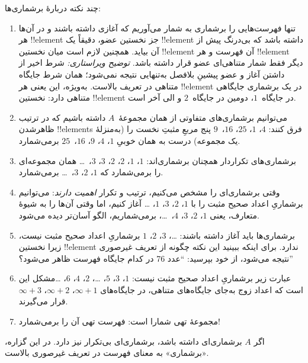 \documentclass[../../../include/open-logic-section]{subfiles}
\begin{document}
\begin{explain}
چند نکته دربارهٔ برشماری‌ها:
\begin{enumerate}
\item تنها فهرست‌هایی را برشماری به شمار می‌آوریم که آغازی داشته باشند و
  در آن‌ها هر !!{element} جز نخستین عضو، دقیقاً یک
  !!{element} داشته باشد که بی‌درنگ پیش از آن بیاید. همچنین لازم است میان
  نخستین !!{element} آن فهرست و هر !!{element} دیگر فقط شمار متناهی‌ای عضو
  قرار داشته باشد. \emph{توضیح ویراستاری:} شرط اخیر از داشتن آغاز و عضو پیشینِ
  بلافصل به‌تنهایی نتیجه نمی‌شود؛ همان شرط جایگاه متناهی در تعریف بالاست. به‌ویژه، این یعنی هر !!{element} در یک برشماری جایگاهی متناهی
  دارد: نخستین !!{element} در جایگاه~$1$، دومین در جایگاه~$2$ و الی آخر است.
\item می‌توانیم برشماری‌های متفاوتی از همان مجموعهٔ~$A$ داشته باشیم که
  در ترتیب ظاهرشدن !!{element}s فرق کنند: $4$، $1$،
  $25$، $16$،~$9$ پنج مربعِ مثبتِ نخست را (به‌منزلهٔ یک مجموعه) درست
  به همان خوبیِ $1$، $4$، $9$، $16$،~$25$ برمی‌شمارد.
\item برشماری‌های تکراردار همچنان برشماری‌اند: $1$، $1$، $2$،
  $2$، $3$، $3$،~\dots{} همان مجموعه‌ای را برمی‌شمارد که $1$، $2$،
  $3$،~\dots{} برمی‌شمارد.
\item وقتی برشماری‌ای را مشخص می‌کنیم، ترتیب و تکرار \emph{اهمیت
  دارند}: می‌توانیم برشماریِ اعداد صحیح مثبت را با $1$، $2$، $3$، $1$،
  \dots{} آغاز کنیم، اما وقتی آن‌ها را به شیوهٔ متعارف، یعنی $1$، $2$،
  $3$، $4$،~\dots، برمی‌شماریم، الگو آسان‌تر دیده می‌شود.
\item برشماری‌ها باید آغاز داشته باشند: \dots، $3$، $2$، $1$ برشماریِ
  اعداد صحیح مثبت نیست، زیرا نخستین !!{element} ندارد. برای اینکه ببینید
  این نکته چگونه از تعریف غیرصوری نتیجه می‌شود، از خود بپرسید: ``عدد 76
  در کدام جایگاه فهرست ظاهر می‌شود؟''
\item عبارت زیر برشماریِ اعداد صحیح مثبت نیست:
  $1$، $3$، $5$، \dots، $2$، $4$، $6$، \dots\@ مشکل این است که
  اعداد زوج به‌جای جایگاه‌های متناهی، در جایگاه‌های $\infty + 1$،
  $\infty + 2$، $\infty +
  3$ قرار می‌گیرند.
\item مجموعهٔ تهی شمارا است: فهرست تهی آن را برمی‌شمارد!{}
\end{enumerate}
\end{explain}

\begin{prop}
  اگر $A$ برشماری‌ای داشته باشد، برشماری‌ای بی‌تکرار نیز دارد.
  در این گزاره، «برشماری» به معنای فهرست در تعریف غیرصوری بالاست.
\end{prop}
\end{document}
